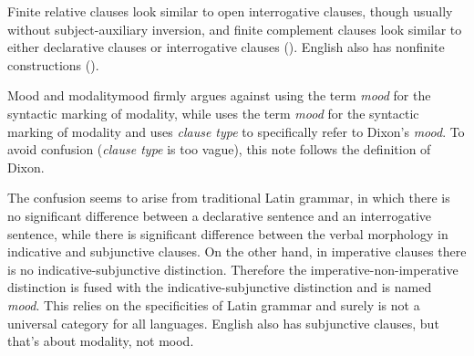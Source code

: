 \documentclass[UTF8, a4paper, oneside, scheme=plain]{ctexrep}
\newcommand*{\term}[1]{\emph{#1}}
\begin{document}
Finite relative clauses look similar to open interrogative clauses,
though usually without subject-auxiliary inversion,
and finite complement clauses look similar to either declarative clauses or interrogative clauses 
().
English also has nonfinite constructions ().

\begin{infobox}{Mood and modality}{mood}
    \citet{dixon2009basic1} firmly argues against using the term \term{mood} 
    for the syntactic marking of modality,
    while \citet{cgel} uses the term \term{mood} for the syntactic marking of modality
    and uses \term{clause type} to specifically refer to Dixon's \term{mood}.
    To avoid confusion (\term{clause type} is too vague),
    this note follows the definition of Dixon.

    The confusion seems to arise from traditional Latin grammar,
    in which there is no significant difference 
    between a declarative sentence and an interrogative sentence, 
    while there is significant difference
    between the verbal morphology in indicative and subjunctive clauses.
    On the other hand, in imperative clauses 
    there is no indicative-subjunctive distinction.
    Therefore the imperative-non-imperative distinction is fused with 
    the indicative-subjunctive distinction 
    and is named \term{mood}.
    This relies on the specificities of Latin grammar 
    and surely is not a universal category for all languages.
    English also has subjunctive clauses,
    but that's about modality, not mood.
\end{infobox}
\end{document}
